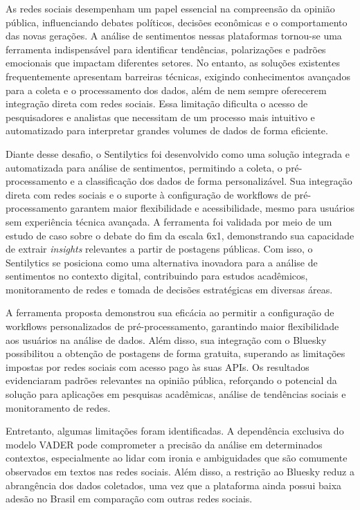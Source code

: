 \documentclass[
	12pt,				%
	oneside,			%
	a4paper,			%
	english,			%
	french,				%
	spanish,			%
	brazil				%
	]{abntex2}
\begin{document}
As redes sociais desempenham um papel essencial na compreensão da
opinião pública, influenciando debates políticos, decisões econômicas e
o comportamento das novas gerações. A análise de sentimentos nessas
plataformas tornou-se uma ferramenta indispensável para identificar
tendências, polarizações e padrões emocionais que impactam diferentes
setores. No entanto, as soluções existentes frequentemente apresentam
barreiras técnicas, exigindo conhecimentos avançados para a coleta e o
processamento dos dados, além de nem sempre oferecerem integração direta
com redes sociais. Essa limitação dificulta o acesso de pesquisadores e
analistas que necessitam de um processo mais intuitivo e automatizado
para interpretar grandes volumes de dados de forma eficiente.

Diante desse desafio, o Sentilytics foi desenvolvido como uma solução
integrada e automatizada para análise de sentimentos, permitindo a
coleta, o pré-processamento e a classificação dos dados de forma
personalizável. Sua integração direta com redes sociais e o suporte à
configuração de workflows de pré-processamento garantem maior
flexibilidade e acessibilidade, mesmo para usuários sem experiência
técnica avançada. A ferramenta foi validada por meio de um estudo de
caso sobre o debate do fim da escala 6x1, demonstrando sua capacidade de
extrair \emph{insights} relevantes a partir de postagens públicas. Com
isso, o Sentilytics se posiciona como uma alternativa inovadora para a
análise de sentimentos no contexto digital, contribuindo para estudos
acadêmicos, monitoramento de redes e tomada de decisões estratégicas em
diversas áreas.

A ferramenta proposta demonstrou sua eficácia ao permitir a configuração
de workflows personalizados de pré-processamento, garantindo maior
flexibilidade aos usuários na análise de dados. Além disso, sua
integração com o Bluesky possibilitou a obtenção de postagens de forma
gratuita, superando as limitações impostas por redes sociais com acesso
pago às suas APIs. Os resultados evidenciaram padrões relevantes na
opinião pública, reforçando o potencial da solução para aplicações em
pesquisas acadêmicas, análise de tendências sociais e monitoramento de
redes.

Entretanto, algumas limitações foram identificadas. A dependência
exclusiva do modelo VADER pode comprometer a precisão da análise em
determinados contextos, especialmente ao lidar com ironia e ambiguidades
que são comumente observados em textos nas redes sociais. Além disso, a
restrição ao Bluesky reduz a abrangência dos dados coletados, uma vez
que a plataforma ainda possui baixa adesão no Brasil em comparação com
outras redes sociais.
\end{document}
